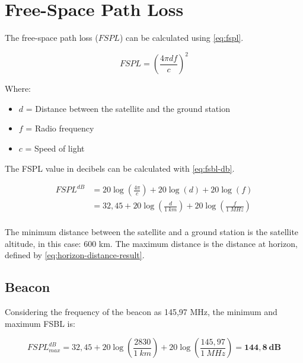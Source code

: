 

\section{Free-Space Path Loss}

The free-space path loss ($FSPL$) can be calculated using \autoref{eq:fspl}.

\begin{equation} \label{eq:fspl}
FSPL = \left( \frac{4\pi d f}{c} \right)^{2}
\end{equation}

Where:

\begin{itemize}
    \item $d$ = Distance between the satellite and the ground station
    \item $f$ = Radio frequency
    \item $c$ = Speed of light
\end{itemize}

The FSPL value in decibels can be calculated with \autoref{eq:fsbl-db}.

\begin{equation} \label{eq:fsbl-db}
    \begin{split}
        FSPL^{dB} & = 20\log\left(\frac{4\pi}{c}\right) + 20\log\left(d\right) + 20\log\left(f\right) \\
                  & = 32,45 + 20\log\left(\frac{d}{1\ km}\right) + 20\log\left(\frac{f}{1\ MHz}\right) \\
    \end{split}
\end{equation}

The minimum distance between the satellite and a ground station is the satellite altitude, in this case: 600 km. The maximum distance is the distance at horizon, defined by \autoref{eq:horizon-distance-result}.

\subsection{Beacon}

Considering the frequency of the beacon as 145,97 MHz, the minimum and maximum FSBL is:

\begin{equation}
FSPL^{dB}_{max} = 32,45 + 20\log\left(\frac{2830}{1\ km}\right) + 20\log\left(\frac{145,97}{1\ MHz}\right) = \mathbf{144,8\ dB}
\end{equation}


